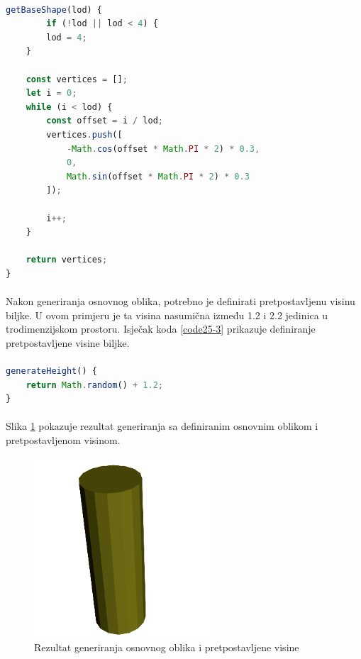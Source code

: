 \documentclass[times, utf8, diplomski]{fer}
\begin{document}
\paragraph{}
\begin{lstlisting}[language=Javascript,caption=Generiranje osnovnog oblika biljke,label=code25-2]
getBaseShape(lod) {
		if (!lod || lod < 4) {
		lod = 4;
	}

	const vertices = [];
	let i = 0;
	while (i < lod) {
		const offset = i / lod;
		vertices.push([
			-Math.cos(offset * Math.PI * 2) * 0.3,
			0,
			Math.sin(offset * Math.PI * 2) * 0.3
		]);

		i++;
	}

	return vertices;
}
\end{lstlisting}

\paragraph{}
Nakon generiranja osnovnog oblika, potrebno je definirati pretpostavljenu visinu biljke.
U ovom primjeru je ta visina nasumična između 1.2 i 2.2 jedinica u trodimenzijskom 
prostoru. Isječak koda \ref{code25-3} prikazuje definiranje pretpostavljene visine biljke.
\paragraph{}
\begin{lstlisting}[language=Javascript,caption=Generiranje visine biljke,label=code25-3]
generateHeight() {
	return Math.random() + 1.2;
}
\end{lstlisting}
\paragraph{}
Slika \ref{fig:25-2} pokazuje rezultat generiranja sa definiranim osnovnim oblikom i 
pretpostavljenom visinom.

\begin{figure}[h]
	\centering
	\includegraphics[width=0.6\textwidth]{img/25-2}
	\caption{Rezultat generiranja osnovnog oblika i pretpostavljene visine}
	\label{fig:25-2}
\end{figure}
\end{document}
